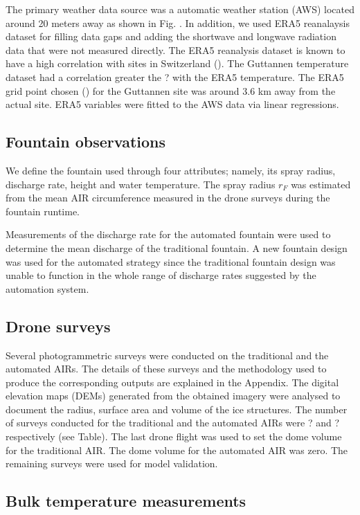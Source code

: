 \documentclass[tc, manuscript]{copernicus}
\begin{document}
The primary weather data source was a automatic weather station (AWS) located around 20 meters away as shown in
Fig. . In addition, we used ERA5 reanalaysis dataset for filling data gaps and adding the shortwave and longwave
radiation data that were not measured directly. The ERA5 reanalysis dataset is known to have a high correlation
with sites in Switzerland (). The Guttannen temperature dataset had a correlation greater the ? with the ERA5
temperature. The ERA5 grid point chosen () for the Guttannen site was around 3.6 km away from the actual site.
ERA5 variables were fitted to the AWS data via linear regressions. 

\subsection{Fountain observations}

We define the fountain used through four attributes; namely, its spray radius, discharge rate, height and water
temperature. The spray radius $r_F$ was estimated from the mean AIR circumference
measured in the drone surveys during the fountain runtime. 

Measurements of the discharge rate for the automated fountain were used to determine the mean discharge of the
traditional fountain. A new fountain design was used for the automated strategy since the traditional fountain
design was unable to function in the whole range of discharge rates suggested by the automation system.

\subsection{Drone surveys}

Several photogrammetric surveys were conducted on the traditional and the automated AIRs. The details of these
surveys and the methodology used to produce the corresponding outputs are explained in the Appendix. The digital
elevation maps (DEMs) generated from the obtained imagery were analysed to document the radius, surface area and
volume of the ice structures. The number of surveys conducted for the traditional and the automated AIRs were
? and ? respectively (see Table). The last drone flight was used to set the dome volume for the traditional AIR.
The dome volume for the automated AIR was zero.  The remaining surveys were used for model validation.

\subsection{Bulk temperature measurements}
\end{document}
